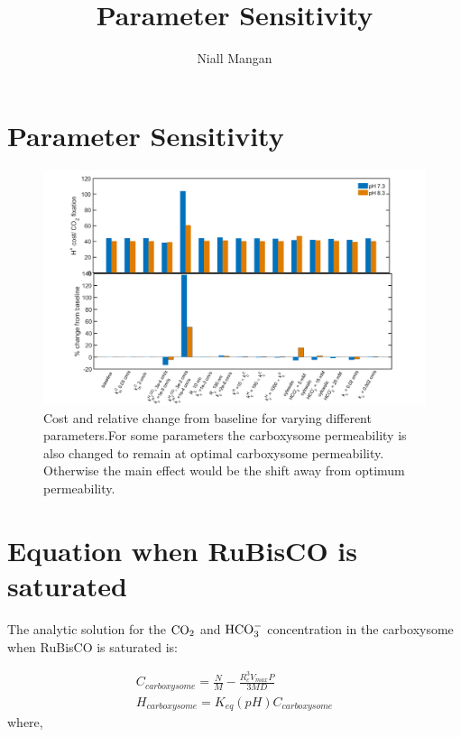 \documentclass[]{article}
\title{Parameter Sensitivity}
\author{Niall Mangan}
\begin{document}
\maketitle

\begin{abstract}

\end{abstract}
\section{Parameter Sensitivity}
\begin{figure}[h!]
	\includegraphics[width = \textwidth]{both.png}
	\caption{Cost and relative change from baseline for varying different parameters.For some parameters the carboxysome permeability is also changed to remain at optimal carboxysome permeability. Otherwise the main effect would be the shift away from optimum permeability.}
\end{figure}

\section{Equation when RuBisCO is saturated}
The analytic solution for the ${\rm CO_2}$ and ${\rm HCO_3^-}$ concentration in the carboxysome when RuBisCO is saturated is:

\begin{eqnarray}
C_{carboxysome} = \frac{N}{M} - \frac{R_c^3 V_{max}P}{3 M D}\\
H_{carboxysome} = K_{eq}(pH) C_{carboxysome}
\end{eqnarray}
where,
\end{document}
